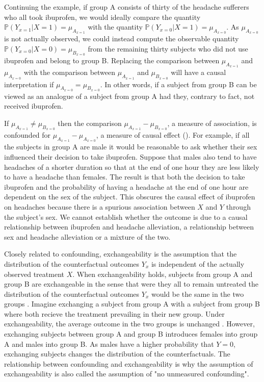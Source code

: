 \documentclass[11pt]{article}
\begin{document}
Continuing the example, if group A consists of thirty of the headache
sufferers who all took ibuprofen, we would ideally compare the quantity
\(\mathbb{P}(Y_{x = 1}|X = 1) = \mu_{A_{x = 1}}\) with the quantity
\(\mathbb{P}(Y_{x = 0}|X = 1) = \mu_{A_{x = 0}}\). As
\(\mu_{A_{x = 0}}\) is not actually observed, we could instead compute
the observable quantity \(\mathbb{P}(Y_{x = 0}|X = 0) = \mu_{B_{x=0}}\)
from the remaining thirty subjects who did not use ibuprofen and belong
to group B. Replacing the comparison between \(\mu_{A_{x = 1}}\) and
\(\mu_{A_{x = 0}}\) with the comparison between \(\mu_{A_{x = 1}}\) and
\(\mu_{B_{x=0}}\) will have a causal interpretation if
\(\mu_{A_{x = 0}} = \mu_{B_{x=0}}\). In other words, if a subject from
group B can be viewed as an analogue of a subject from group A had they,
contrary to fact, not received ibuprofen. \linebreak

If \(\mu_{A_{x = 1}} \neq \mu_{B_{x=0}}\) then the comparison
\(\mu_{A_{x = 1}} - \mu_{B_{x=0}}\), a measure of association, is
confounded for \(\mu_{A_{x = 1}} - \mu_{A_{x = 0}}\), a measure of
causal effect (\citet{Greenland1999}). For example, if all the subjects
in group A are male it would be reasonable to ask whether their sex
influenced their decision to take ibuprofen. Suppose that males also
tend to have headaches of a shorter duration so that at the end of one
hour they are less likely to have a headache than females. The result is
that both the decision to take ibuprofen and the probability of having a
headache at the end of one hour are dependent on the sex of the subject.
This obscures the causal effect of ibuprofen on headaches because there
is a spurious association between \(X\) and \(Y\) through the subject's
sex. We cannot establish whether the outcome is due to a causal
relationship between ibuprofen and headache alleviation, a relationship
between sex and headache alleviation or a mixture of the two. \linebreak

Closely related to confounding, exchangeability is the assumption that
the distribution of the counterfactual outcomes \(Y_{x}\) is independent
of the actually observed treatment \(X\). When exchangeability holds,
subjects from group A and group B are exchangeable in the sense that
were they all to remain untreated the distribution of the counterfactual
outcomes \(Y_{x}\) would be the same in the two groups
\citet{Daniel2013}. Imagine exchanging a subject from group A with a
subject from group B where both recieve the treatment prevailing in
their new group. Under exchangeability, the average outcome in the two
groups is unchanged \citet{HernanMA2018}. However, exchanging subjects
between group A and group B introduces females into group A and males
into group B. As males have a higher probability that \(Y = 0\),
exchanging subjects changes the distribution of the counterfactuals. The
relationship between confounding and exchangeability is why the
assumption of exchangeability is also called the assumption of "no
unmeasured confounding". \linebreak
\end{document}
